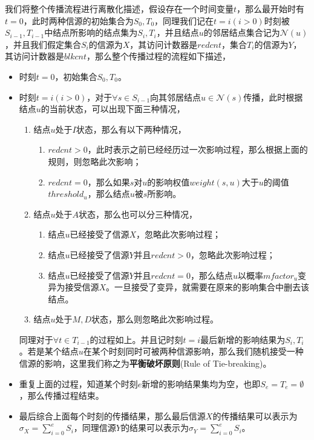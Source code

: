 我们将整个传播流程进行离散化描述，假设存在一个时间变量$t$，那么最开始时有$t=0$，此时两种信源的初始集合为$S_{0}, T_{0}$，同理我们记在$t=i(i>0)$时刻被$S_{i-1}, T_{i-1}$中结点所影响的结点集为$S_{i}, T_{i}$，并且结点$u$的邻居结点集合记为$\mathcal{N}(u)$，并且我们假定集合$S_{i}$的信源为$X$，其访问计数器是$redcnt$，集合$T_{i}$的信源为$Y$，其访问计数器是$blkcnt$，那么整个传播过程的流程如下描述，
\begin{itemize}
\item 时刻$t=0$，初始集合$S_{0}, T_{0}$。
\item 时刻$t=i(i>0)$，对于$\forall s \in S_{i-1}$向其邻居结点$u \in \mathcal{N}(s)$传播，此时根据结点$u$的当前状态，可以出现下面三种情况，
	\begin{enumerate}
	\item 结点$u$处于$I$状态，那么有以下两种情况，
		\begin{enumerate}
		\item $redcnt>0$，此时表示之前已经经历过一次影响过程，那么根据上面的规则，则忽略此次影响；
		\item $redcnt=0$，那么如果$s$对$u$的影响权值$weight(s, u)$大于$u$的阈值$threshold_{u}$，那么结点$u$被$s$所影响。
		\end{enumerate}
	\item 结点$u$处于$A$状态，那么也可以分三种情况，
		\begin{enumerate}
		\item 结点$u$已经接受了信源$X$，忽略此次影响过程；
		\item 结点$u$已经接受了信源$Y$并且$redcnt>0$，忽略此次影响过程；
		\item 结点$u$已经接受了信源$Y$并且$redcnt=0$，那么结点$u$以概率$mfactor_{u}$变异为接受信源$X$。一旦接受了变异，就需要在原来的影响集合中删去该结点。
		\end{enumerate}
	\item 结点$u$处于$M,D$状态，那么则忽略此次影响过程。
	\end{enumerate}
	同理对于$\forall t \in T_{i-1}$的过程如上。并且记时刻$t=i$最后新增的影响结果为$S_{i}, T_{i}$。若是某个结点$u$在某个时刻同时可被两种信源影响，那么我们随机接受一种信源的影响，这里我们称之为\textbf{平衡破坏原则}(Rule of Tie-breaking)。
\item 重复上面的过程，知道某个时刻$e$新增的影响结果集均为空，也即$S_{e}=T_{e}=\emptyset$，那么传播过程结束。
\item 最后综合上面每个时刻的传播结果，那么最后信源$X$的传播结果可以表示为$\sigma_{X}=\sum_{i=0}^{e}S_{i}$，同理信源$Y$的结果可以表示为$\sigma_{Y}=\sum_{i=0}^{e}S_{i}$。
\end{itemize}

